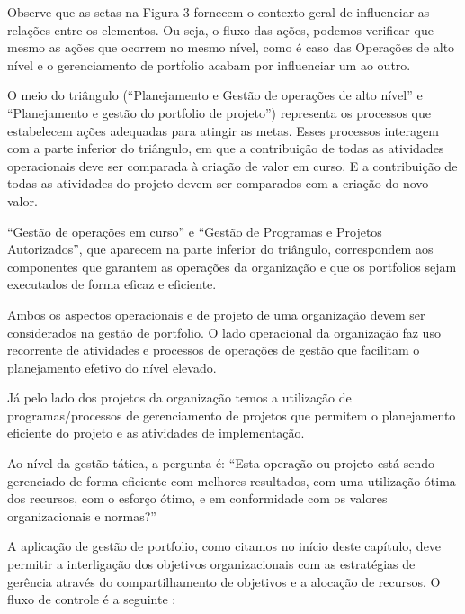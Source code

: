 \documentclass[12pt,a4paper,ruledheader,tocpage=prefix,floatnumber=continuous,pagestart=folhaderosto,font=times]{abnt}
\begin{document}
Observe que as setas na Figura 3 fornecem o contexto geral de influenciar as relações entre os elementos. Ou seja, o fluxo das ações, podemos verificar que mesmo as ações que ocorrem no mesmo nível, como é caso 
das Operações de alto nível e o gerenciamento de portfolio acabam por influenciar um ao outro.

O meio do triângulo (``Planejamento e Gestão de operações de alto nível'' e ``Planejamento e gestão do portfolio de projeto'') representa os processos 
que estabelecem ações adequadas para atingir as metas. Esses processos interagem com a parte inferior do triângulo, em que a contribuição de todas as 
atividades operacionais deve ser comparada à criação de valor em curso. E a contribuição de todas as atividades do projeto devem ser comparados com a 
criação do novo valor.

``Gestão de operações em curso'' e ``Gestão de Programas e Projetos Autorizados'', que aparecem na parte inferior do triângulo, correspondem aos 
componentes que garantem as operações da organização e que os portfolios sejam executados de forma eficaz e eficiente\cite{SPPM2008}.

Ambos os aspectos operacionais e de projeto de uma organização devem ser considerados na gestão de portfolio. O lado operacional da organização faz 
uso recorrente de atividades e processos de operações de gestão que facilitam o planejamento efetivo do nível elevado. 

Já pelo lado dos projetos da organização temos a utilização de programas/processos de gerenciamento de projetos que permitem o planejamento eficiente do 
projeto e as atividades de implementação.

Ao nível da gestão tática, a pergunta é: ``Esta operação ou projeto está sendo gerenciado de forma eficiente com melhores resultados, com uma utilização 
ótima dos recursos, com o esforço ótimo, e em conformidade com os valores organizacionais e normas?''

A aplicação de gestão de portfolio, como citamos no início deste capítulo, deve permitir a interligação dos objetivos organizacionais com as estratégias de 
gerência através do compartilhamento de objetivos e a alocação de recursos. O fluxo de controle é a seguinte \cite{SPPM2008}:
\end{document}
